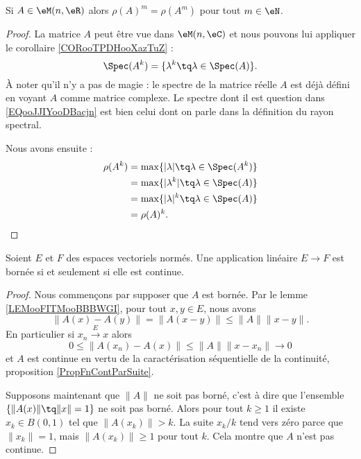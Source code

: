 \begin{proposition}     \label{PROPooYPLGooWKLbPA}
    Si \( A\in \eM(n,\eR)\) alors \( \rho(A)^m=\rho(A^m)\) pour tout \( m\in \eN\).
\end{proposition}

\begin{proof}
    La matrice \( A\) peut être vue dans \( \eM(n,\eC)\) et nous pouvons lui appliquer le corollaire \ref{CORooTPDHooXazTuZ} :
    \begin{equation}        \label{EQooJJIYooDBacjn}
        \Spec(A^k)=\{ \lambda^k\tq \lambda\in\Spec(A) \}.
    \end{equation}
    À noter qu'il n'y a pas de magie : le spectre de la matrice réelle \( A\) est déjà défini en voyant \( A\) comme matrice complexe. Le spectre dont il est question dans \eqref{EQooJJIYooDBacjn} est bien celui dont on parle dans la définition du rayon spectral.

    Nous avons ensuite :
    \begin{subequations}
        \begin{align}
            \rho(A^k)&=\max\{ | \lambda |\tq \lambda\in\Spec(A^k) \}\\
            &=\max\{ | \lambda^k |\tq \lambda\in\Spec(A) \}\\
            &=\max\{ | \lambda |^k\tq\lambda\in\Spec(A) \}\\
            &=\rho(A)^k.
        \end{align}
    \end{subequations}
\end{proof}

\begin{proposition}       \label{PROPooQZYVooYJVlBd}
    Soient \( E\) et \( F\) des espaces vectoriels normés. Une application linéaire \( E\to F\) est bornée si et seulement si elle est continue.
\end{proposition}

\begin{proof}
    Nous commençons par supposer que \( A\) est bornée. Par le lemme \ref{LEMooFITMooBBBWGI}, pour tout \( x,y\in E\), nous avons
    \begin{equation}
        \| A(x)-A(y) \|=\| A(x-y) \|\leq \| A \|\| x-y \|.
    \end{equation}
    En particulier si \( x_n\stackrel{E}{\longrightarrow}x\) alors
    \begin{equation}
        0\leq \| A(x_n)-A(x) \|\leq \| A \|\| x-x_n \|\to 0
    \end{equation}
    et \( A\) est continue en vertu de la caractérisation séquentielle de la continuité, proposition \ref{PropFnContParSuite}.

    Supposons maintenant que \( \| A \|\) ne soit pas borné, c'est à dire que l'ensemble \( \{ \| A(x) \|\tq \| x \|=1 \}\) ne soit pas borné. Alors pour tout \( k\geq 1\) il existe \( x_k\in B(0,1)\) tel que \( \| A(x_k) \|>k\). La suite \( x_k/k\) tend vers zéro parce que \( \| x_k \|=1\), mais \( \| A(x_k) \|\geq 1\) pour tout \( k\). Cela montre que \( A\) n'est pas continue.
\end{proof}

